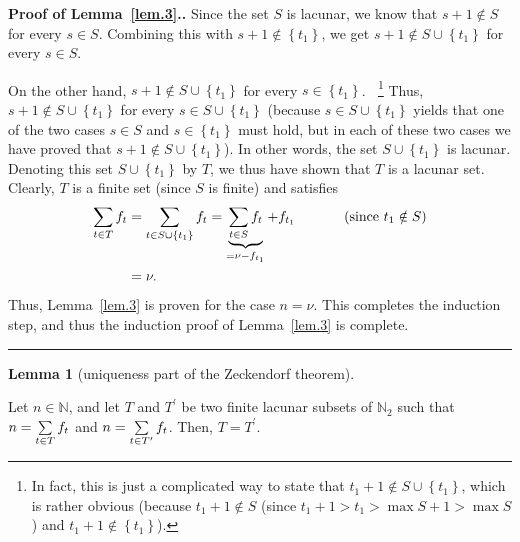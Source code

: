 \documentclass[numbers=enddot,12pt,final,onecolumn,notitlepage]{scrartcl}%
\numberwithin{exer}{section}
\theoremstyle{definition}
\newtheorem{lem}[theo]{Lemma}
\newenvironment{lemma}[1][]
{\begin{lem}[#1]\begin{leftbar}}
{\end{leftbar}\end{lem}}
\newenvironment{proof}[1][Proof]{\noindent\textbf{#1.} }{\ \rule{0.5em}{0.5em}}
\let\sumnonlimits\sum
\renewcommand{\sum}{\sumnonlimits\limits}
\begin{document}
\begin{proof}[Proof of Lemma~\ref{lem.3}.]
Since the set $S$ is lacunar, we know that $s+1\notin S$ for every $s\in S$.
Combining this with $s+1\notin\left\{  t_{1}\right\}  $, we get $s+1\notin
S\cup\left\{  t_{1}\right\}  $ for every $s\in S$.

On the other hand, $s+1\notin S\cup\left\{  t_{1}\right\}  $ for every
$s\in\left\{  t_{1}\right\}  $.$\ \ \ \ $\footnote{In fact, this is just a
complicated way to state that $t_{1}+1\notin S\cup\left\{  t_{1}\right\}  $,
which is rather obvious (because $t_{1}+1\notin S$ (since $t_{1}+1>t_{1}>\max
S+1>\max S$) and $t_{1}+1\notin\left\{  t_{1}\right\}  $).} Thus, $s+1\notin
S\cup\left\{  t_{1}\right\}  $ for every $s\in S\cup\left\{  t_{1}\right\}  $
(because $s\in S\cup\left\{  t_{1}\right\}  $ yields that one of the two cases
$s\in S$ and $s\in\left\{  t_{1}\right\}  $ must hold, but in each of these
two cases we have proved that $s+1\notin S\cup\left\{  t_{1}\right\}  $). In
other words, the set $S\cup\left\{  t_{1}\right\}  $ is lacunar. Denoting this
set $S\cup\left\{  t_{1}\right\}  $ by $T$, we thus have shown that $T$ is a
lacunar set. Clearly, $T$ is a finite set (since $S$ is finite) and satisfies%
\begin{align*}
\sum\limits_{t\in T}f_{t}  &  =\sum\limits_{t\in S\cup\left\{  t_{1}\right\}
}f_{t}=\underbrace{\sum\limits_{t\in S}f_{t}}_{=\nu-f_{t_{1}}}+f_{t_{1}%
}\ \ \ \ \ \ \ \ \ \ \left(  \text{since }t_{1}\notin S\right) \\
&  =\nu.
\end{align*}
Thus, Lemma~\ref{lem.3} is proven for the case $n=\nu$. This completes the induction
step, and thus the induction proof of Lemma~\ref{lem.3} is complete.
\end{proof}

\begin{lemma}[uniqueness part of the Zeckendorf theorem] \label{lem.4}
Let
$n\in\mathbb{N}$, and let $T$ and $T^{\prime}$ be two finite lacunar subsets
of $\mathbb{N}_{2}$ such that $n=\sum\limits_{t\in T}f_{t}$ and $n=\sum
\limits_{t\in T^{\prime}}f_{t}$. Then, $T=T^{\prime}$.
\end{lemma}
\end{document}
